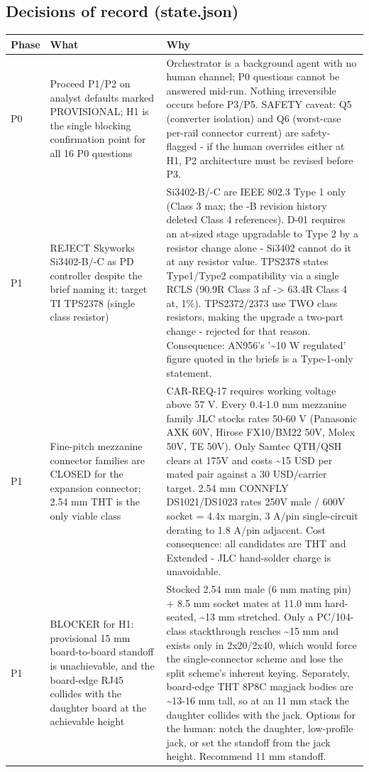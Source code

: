 \documentclass[11pt,a4paper]{article}
\begin{document}
\subsection*{Decisions of record (state.json)}
{\small
\begin{longtable}{lp{5.2cm}p{7.2cm}}
\toprule
\textbf{Phase} & \textbf{What} & \textbf{Why} \\
\midrule
\endhead
P0 & Proceed P1/P2 on analyst defaults marked PROVISIONAL; H1 is the single blocking confirmation point for all 16 P0 questions & Orchestrator is a background agent with no human channel; P0 questions cannot be answered mid-run. Nothing irreversible occurs before P3/P5. SAFETY caveat: Q5 (converter isolation) and Q6 (worst-case per-rail connector current) are safety-flagged - if the human overrides either at H1, P2 architecture must be revised before P3. \\
P1 & REJECT Skyworks Si3402-B/-C as PD controller despite the brief naming it; target TI TPS2378 (single class resistor) & Si3402-B/-C are IEEE 802.3 Type 1 only (Class 3 max; the -B revision history deleted Class 4 references). D-01 requires an at-sized stage upgradable to Type 2 by a resistor change alone - Si3402 cannot do it at any resistor value. TPS2378 states Type1/Type2 compatibility via a single RCLS (90.9R Class 3 af -\textgreater{} 63.4R Class 4 at, 1\%). TPS2372/2373 use TWO class resistors, making the upgrade a two-part change - rejected for that reason. Consequence: AN956's '\textasciitilde{}10 W regulated' figure quoted in the briefs is a Type-1-only statement. \\
P1 & Fine-pitch mezzanine connector families are CLOSED for the expansion connector; 2.54 mm THT is the only viable class & CAR-REQ-17 requires working voltage above 57 V. Every 0.4-1.0 mm mezzanine family JLC stocks rates 50-60 V (Panasonic AXK 60V, Hirose FX10/BM22 50V, Molex 50V, TE 50V). Only Samtec QTH/QSH clears at 175V and costs \textasciitilde{}15 USD per mated pair against a 30 USD/carrier target. 2.54 mm CONNFLY DS1021/DS1023 rates 250V male / 600V socket = 4.4x margin, 3 A/pin single-circuit derating to 1.8 A/pin adjacent. Cost consequence: all candidates are THT and Extended - JLC hand-solder charge is unavoidable. \\
P1 & BLOCKER for H1: provisional 15 mm board-to-board standoff is unachievable, and the board-edge RJ45 collides with the daughter board at the achievable height & Stocked 2.54 mm male (6 mm mating pin) + 8.5 mm socket mates at 11.0 mm hard-seated, \textasciitilde{}13 mm stretched. Only a PC/104-class stackthrough reaches \textasciitilde{}15 mm and exists only in 2x20/2x40, which would force the single-connector scheme and lose the split scheme's inherent keying. Separately, board-edge THT 8P8C magjack bodies are \textasciitilde{}13-16 mm tall, so at an 11 mm stack the daughter collides with the jack. Options for the human: notch the daughter, low-profile jack, or set the standoff from the jack height. Recommend 11 mm standoff. \\

\end{longtable}}
\end{document}
